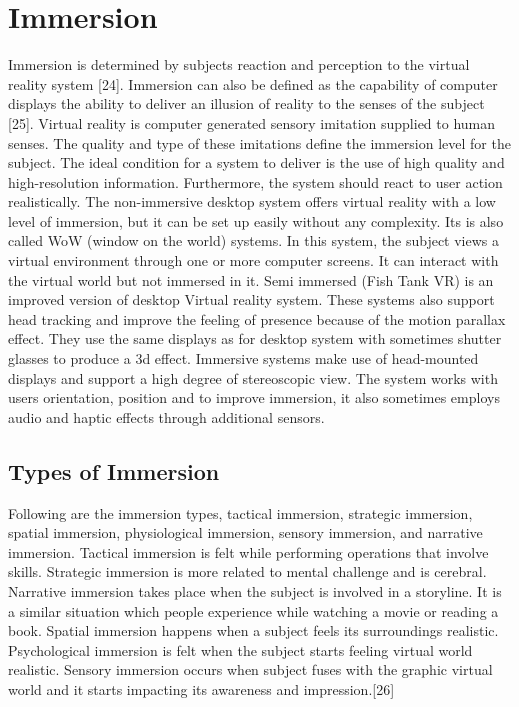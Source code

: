 \section{Immersion}
Immersion is determined by subjects reaction and perception to the virtual reality system [24]. Immersion can also be defined as the capability of computer displays the ability to deliver an illusion of reality to the senses of the subject [25]. Virtual reality is computer generated sensory imitation supplied to human senses. The quality and type of these imitations define the immersion level for the subject. The ideal condition for a system to deliver is the use of high quality and high-resolution information. Furthermore, the system should react to user action realistically. The non-immersive desktop system offers virtual reality with a low level of immersion, but it can be set up easily without any complexity. Its is also called WoW (window on the world) systems. In this system, the subject views a virtual environment through one or more computer screens. It can interact with the virtual world but not immersed in it. Semi immersed (Fish Tank VR) is an improved version of desktop Virtual reality system. These systems also support head tracking and improve the feeling of presence because of the motion parallax effect. They use the same displays as for desktop system with sometimes shutter glasses to produce a 3d effect. Immersive systems make use of head-mounted displays and support a high degree of stereoscopic view. The system works with users orientation, position and to improve immersion, it also sometimes employs audio and haptic effects through additional sensors.

\subsection{Types of Immersion}
Following are the immersion types, tactical immersion, strategic immersion, spatial immersion, physiological immersion, sensory immersion, and narrative immersion. Tactical immersion is felt while performing operations that involve skills. Strategic immersion is more related to mental challenge and is cerebral. Narrative immersion takes place when the subject is involved in a storyline. It is a similar situation which people experience while watching a movie or reading a book. Spatial immersion happens when a subject feels its surroundings realistic. Psychological immersion is felt when the subject starts feeling virtual world realistic. Sensory immersion occurs when subject fuses with the graphic virtual world and it starts impacting its awareness and impression.[26]

